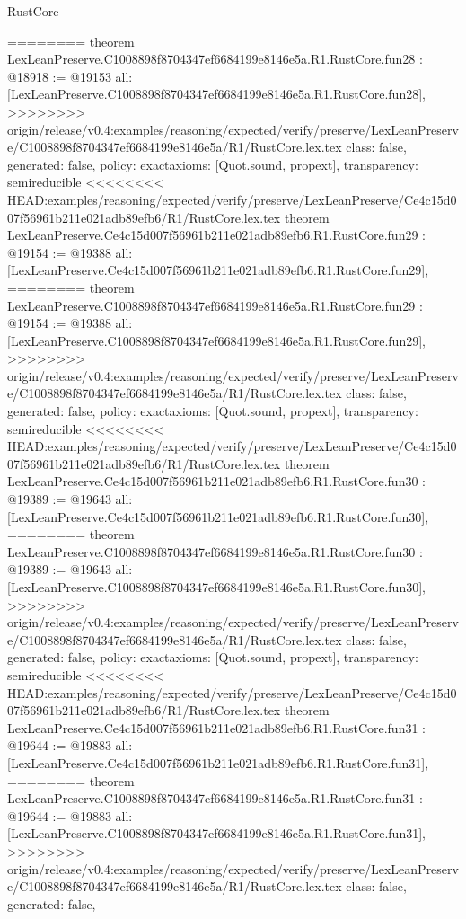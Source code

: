 \begin{lexlean}{RustCore}
\begin{coremodule}
{\begin{coremodule}
{{{{{{{{{{{{{{{{{{{{{{{{{{{{{{{========
theorem LexLeanPreserve.C1008898f8704347ef6684199e8146e5a.R1.RustCore.fun28 : @18918 := @19153 {
  all: [LexLeanPreserve.C1008898f8704347ef6684199e8146e5a.R1.RustCore.fun28],
>>>>>>>> origin/release/v0.4:examples/reasoning/expected/verify/preserve/LexLeanPreserve/C1008898f8704347ef6684199e8146e5a/R1/RustCore.lex.tex
  class: false,
  generated: false,
  policy: exact{axioms: [Quot.sound, propext]},
  transparency: semireducible
}
<<<<<<<< HEAD:examples/reasoning/expected/verify/preserve/LexLeanPreserve/Ce4c15d007f56961b211e021adb89efb6/R1/RustCore.lex.tex
theorem LexLeanPreserve.Ce4c15d007f56961b211e021adb89efb6.R1.RustCore.fun29 : @19154 := @19388 {
  all: [LexLeanPreserve.Ce4c15d007f56961b211e021adb89efb6.R1.RustCore.fun29],
========
theorem LexLeanPreserve.C1008898f8704347ef6684199e8146e5a.R1.RustCore.fun29 : @19154 := @19388 {
  all: [LexLeanPreserve.C1008898f8704347ef6684199e8146e5a.R1.RustCore.fun29],
>>>>>>>> origin/release/v0.4:examples/reasoning/expected/verify/preserve/LexLeanPreserve/C1008898f8704347ef6684199e8146e5a/R1/RustCore.lex.tex
  class: false,
  generated: false,
  policy: exact{axioms: [Quot.sound, propext]},
  transparency: semireducible
}
<<<<<<<< HEAD:examples/reasoning/expected/verify/preserve/LexLeanPreserve/Ce4c15d007f56961b211e021adb89efb6/R1/RustCore.lex.tex
theorem LexLeanPreserve.Ce4c15d007f56961b211e021adb89efb6.R1.RustCore.fun30 : @19389 := @19643 {
  all: [LexLeanPreserve.Ce4c15d007f56961b211e021adb89efb6.R1.RustCore.fun30],
========
theorem LexLeanPreserve.C1008898f8704347ef6684199e8146e5a.R1.RustCore.fun30 : @19389 := @19643 {
  all: [LexLeanPreserve.C1008898f8704347ef6684199e8146e5a.R1.RustCore.fun30],
>>>>>>>> origin/release/v0.4:examples/reasoning/expected/verify/preserve/LexLeanPreserve/C1008898f8704347ef6684199e8146e5a/R1/RustCore.lex.tex
  class: false,
  generated: false,
  policy: exact{axioms: [Quot.sound, propext]},
  transparency: semireducible
}
<<<<<<<< HEAD:examples/reasoning/expected/verify/preserve/LexLeanPreserve/Ce4c15d007f56961b211e021adb89efb6/R1/RustCore.lex.tex
theorem LexLeanPreserve.Ce4c15d007f56961b211e021adb89efb6.R1.RustCore.fun31 : @19644 := @19883 {
  all: [LexLeanPreserve.Ce4c15d007f56961b211e021adb89efb6.R1.RustCore.fun31],
========
theorem LexLeanPreserve.C1008898f8704347ef6684199e8146e5a.R1.RustCore.fun31 : @19644 := @19883 {
  all: [LexLeanPreserve.C1008898f8704347ef6684199e8146e5a.R1.RustCore.fun31],
>>>>>>>> origin/release/v0.4:examples/reasoning/expected/verify/preserve/LexLeanPreserve/C1008898f8704347ef6684199e8146e5a/R1/RustCore.lex.tex
  class: false,
  generated: false,
}}}}}}}}}}}}}}}}}}}}}}}}}}}}}}}}}}}
\end{coremodule}}
\end{coremodule}
\end{lexlean}
